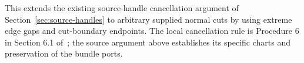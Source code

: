 This extends the existing source-handle cancellation argument of
Section~\ref{sec:source-handles} to arbitrary supplied normal cuts by using
extreme edge gaps and cut-boundary endpoints. The local cancellation rule is
Procedure 6 in Section 6.1 of~\cite{lackenby-parallelity}; the source argument
above establishes its specific charts and preservation of the bundle ports.


